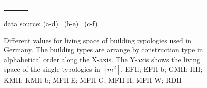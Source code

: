 \begin{figure}[htb]
\vspace{-1cm} 

\hspace{-2.5cm}
  \begin{tabular}{p{0.33\linewidth} p{0.33\linewidth} p{0.33\linewidth}}
&
&
\\

\vspace{-3cm} 
& \vspace{-3cm} 
& \vspace{-3cm}
\\
    \end{tabular}
    
\vspace{-1.6cm}
\begin{flushright}
\footnotesize{data source:
(a-d)~\cite{Blesl.2007}
(b-e)~\cite{Loga.2011}
(c-f)~\cite{Born.2003}
}
\end{flushright}
	\caption[Different values for living space of building typologies used in
	Germany.]{Different values for living space of building typologies used in
	Germany.
    The building types are arrange by construction type in alphabetical order
    along the X-axis.
	The Y-axis shows the living space of the single typologies in
	$[m^2]$.
	EFH; EFH-b; GMH; HH; KMH; KMH-b; MFH-E; MFH-G; MFH-H; MFH-W; RDH}
    \label{fig:DifTypArea}
\end{figure}